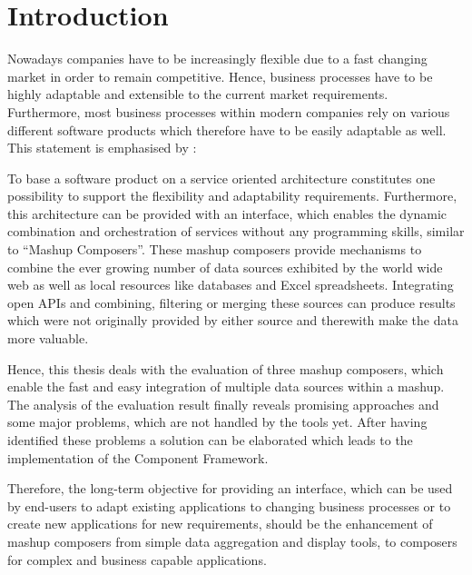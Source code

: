 \chapter{Introduction}
\label{chapter:introduction}

Nowadays companies have to be increasingly flexible due to a fast changing market in order to remain
competitive. Hence, business processes have to be highly adaptable and extensible to the current
market requirements. Furthermore, most business processes within modern companies rely on various
different software products which therefore have to be easily adaptable as well. This statement is
emphasised by \cite{flexible_software}:


To base a software product on a service oriented architecture constitutes one possibility to support
the flexibility and adaptability requirements. Furthermore, this architecture can be provided with an
interface, which enables the dynamic combination and orchestration of services without any
programming skills, similar to ``Mashup Composers''. These mashup composers provide mechanisms to
combine the ever growing number of data sources exhibited by the world wide web as well as local resources like
databases and Excel spreadsheets. Integrating open APIs and combining, filtering or merging these
sources can produce results which were not originally provided by either source and therewith make
the data more valuable.

Hence, this thesis deals with the evaluation of three mashup composers, which enable the fast and
easy integration of multiple data sources within a mashup. The analysis of the evaluation result
finally reveals promising approaches and some major problems, which are not handled by the tools
yet. After having identified these problems a solution can be elaborated which leads to the
implementation of the Component Framework.

Therefore, the long-term objective for providing an interface, which can be used by end-users to
adapt existing applications to changing business processes or to create new applications for new
requirements, should be the enhancement of mashup composers from simple data aggregation and display
tools, to composers for complex and business capable applications.

